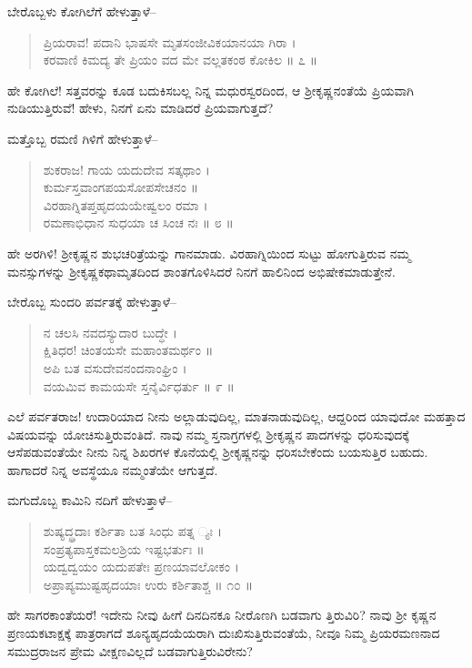 ಬೇರೊಬ್ಬಳು ಕೋಗಿಲೆಗೆ ಹೇಳುತ್ತಾಳೆ–

\begin{verse}
ಪ್ರಿಯರಾವ! ಪದಾನಿ ಭಾಷಸೇ ಮೃತಸಂಜೀವಿಕಯಾನಯಾ ಗಿರಾ ।\\ಕರವಾಣಿ ಕಿಮದ್ಯ ತೇ ಪ್ರಿಯಂ ವದ ಮೇ ವಲ್ಲತಕಂಠ ಕೋಕಿಲ \num{॥ ೭ ॥}
\end{verse}

ಹೇ ಕೋಗಿಲೆ! ಸತ್ತವರನ್ನು ಕೂಡ ಬದುಕಿಸಬಲ್ಲ ನಿನ್ನ ಮಧುರಸ್ವರದಿಂದ, ಆ ಶ್ರೀಕೃಷ್ಣನಂತೆಯೆ ಪ್ರಿಯವಾಗಿ ನುಡಿಯುತ್ತಿರುವೆ! ಹೇಳು, ನಿನಗೆ ಏನು ಮಾಡಿದರೆ ಪ್ರಿಯವಾಗುತ್ತದೆ?

ಮತ್ತೊಬ್ಬ ರಮಣಿ ಗಿಳಿಗೆ ಹೇಳುತ್ತಾಳೆ–

\begin{verse}
ಶುಕರಾಜ! ಗಾಯ ಯದುದೇವ ಸತ್ಕಥಾಂ ।\\ಕುರ್ಮಸ್ತವಾಂಗಪಯಸೋಪಸೇಚನಂ ॥\\ವಿರಹಾಗ್ನಿತಪ್ತಹೃದಯಯೇಷ್ವಲಂ ರಮಾ ।\\ರಮಣಾಭಿಧಾನ ಸುಧಯಾ ಚ ಸಿಂಚ ನಃ \num{॥ ೮ ॥}
\end{verse}

ಹೇ ಅರಗಿಳಿ! ಶ್ರೀಕೃಷ್ಣನ ಶುಭಚರಿತ್ರೆಯನ್ನು ಗಾನಮಾಡು. ವಿರಹಾಗ್ನಿಯಿಂದ ಸುಟ್ಟು ಹೋಗುತ್ತಿರುವ ನಮ್ಮ ಮನಸ್ಸುಗಳನ್ನು ಶ್ರೀಕೃಷ್ಣಕಥಾಮೃತದಿಂದ ಶಾಂತಗೊಳಿಸಿದರೆ ನಿನಗೆ ಹಾಲಿನಿಂದ ಅಭಿಷೇಕಮಾಡುತ್ತೇನೆ.

ಬೇರೊಬ್ಬ ಸುಂದರಿ ಪರ್ವತಕ್ಕೆ ಹೇಳುತ್ತಾಳೆ–

\begin{verse}
ನ ಚಲಸಿ ನವದಸ್ಯುದಾರ ಬುದ್ಧೇ ।\\ಕ್ಷಿತಿಧರ! ಚಿಂತಯಸೇ ಮಹಾಂತಮರ್ಥಂ ॥\\ಅಪಿ ಬತ ವಸುದೇವನಂದನಾಂಘ್ರಿಂ ।\\ವಯಮಿವ ಕಾಮಯಸೇ ಸ್ತನೈರ್ವಿಧರ್ತು \num{॥ ೯ ॥}
\end{verse}

ಎಲೆ ಪರ್ವತರಾಜ! ಉದಾರಿಯಾದ ನೀನು ಅಲ್ಲಾಡುವುದಿಲ್ಲ, ಮಾತನಾಡುವುದಿಲ್ಲ, ಆದ್ದರಿಂದ ಯಾವುದೋ ಮಹತ್ತಾದ ವಿಷಯವನ್ನು ಯೋಚಿಸುತ್ತಿರುವಂತಿದೆ. ನಾವು ನಮ್ಮ ಸ್ತನಾಗ್ರಗಳಲ್ಲಿ ಶ್ರೀಕೃಷ್ಣನ ಪಾದಗಳನ್ನು ಧರಿಸುವುದಕ್ಕೆ ಆಸೆಪಡುವಂತೆಯೇ ನೀನು ನಿನ್ನ ಶಿಖರಗಳ ಕೊನೆಯಲ್ಲಿ ಶ್ರೀಕೃಷ್ಣನನ್ನು ಧರಿಸಬೇಕೆಂದು ಬಯಸುತ್ತಿರ ಬಹುದು. ಹಾಗಾದರೆ ನಿನ್ನ ಅವಸ್ಥೆಯೂ ನಮ್ಮಂತೆಯೇ ಆಗುತ್ತದೆ.

ಮಗುದೊಬ್ಬ ಕಾಮಿನಿ ನದಿಗೆ ಹೇಳುತ್ತಾಳೆ–

\begin{verse}
ಶುಷ್ಯದ್ಧ್ರದಾಃ ಕರ್ಶಿತಾ ಬತ ಸಿಂಧು ಪತ್ನ ್ಯಃ ।\\ಸಂಪ್ರತ್ಯಪಾಸ್ತಕಮಲಶ್ರಿಯ ಇಷ್ಟಭರ್ತುಃ ॥\\ಯದ್ವದ್ವಯಂ ಯದುಪತೇಃ ಪ್ರಣಯಾವಲೋಕಂ ।\\ಅಪ್ರಾಪ್ಯಮುಷ್ಟಹೃದಯಾಃ ಉರು ಕರ್ಶಿತಾಶ್ಚ \num{॥ ೧೦ ॥}
\end{verse}

ಹೇ ಸಾಗರಕಾಂತೆಯರೆ! ಇದೇನು ನೀವು ಹೀಗೆ ದಿನದಿನಕೂ ನೀರೊಣಗಿ ಬಡವಾಗು ತ್ತಿರುವಿರಿ? ನಾವು ಶ್ರೀ ಕೃಷ್ಣನ ಪ್ರಣಯಕಟಾಕ್ಷಕ್ಕೆ ಪಾತ್ರರಾಗದೆ ಶೂನ್ಯಹೃದಯೆಯರಾಗಿ ದುಃಖಿಸುತ್ತಿರುವಂತೆಯೆ, ನೀವೂ ನಿಮ್ಮ ಪ್ರಿಯರಮಣನಾದ ಸಮುದ್ರರಾಜನ ಪ್ರೇಮ ವೀಕ್ಷಣವಿಲ್ಲದೆ ಬಡವಾಗುತ್ತಿರುವಿರೇನು?


